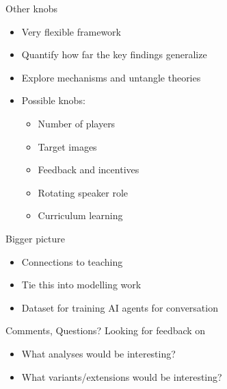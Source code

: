 \documentclass[12pt, xcolor=beamer,table,usenames,dvipsnames, ignorenonframetext, ngerman,t]{beamer}
\begin{document}
\begin{frame}{Other knobs}
	\begin{itemize}
	\item Very flexible framework \pause
	\item Quantify how far the key findings generalize \pause
	\item Explore mechanisms and untangle theories \pause
	\item Possible knobs:\pause
\begin{itemize}
	\item Number of players \pause
	\item Target images \pause
	\item Feedback and incentives \pause
	\item Rotating speaker role \pause
	\item Curriculum learning
\end{itemize}
\end{itemize}
\end{frame}


\begin{frame}{Bigger picture}
	\begin{itemize}
		\item Connections to teaching \pause
		\item Tie this into modelling work \pause
		\item Dataset for training AI agents for conversation
	\end{itemize}
\end{frame}

\begin{frame}{Comments, Questions?}
	Looking for feedback on
	\smallskip
	\begin{itemize}
	\item What analyses would be interesting?
	\item What variants/extensions would be interesting?
	\end{itemize}
\end{frame}
\end{document}
